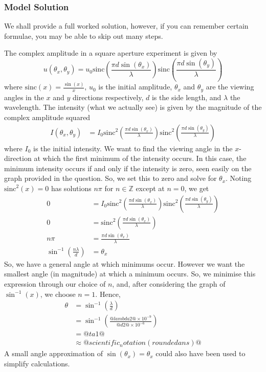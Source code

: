 \documentclass[a4paper,10pt]{article}
\begin{document}
\subsubsection{Model Solution}
We shall provide a full worked solution, however, if you can remember certain formulae, you may be able to skip out many steps.

The complex amplitude in a square aperture experiment is given by \[ u(\theta_x, \theta_y) = u_0 \text{sinc}\left(\frac{\pi d \sin(\theta_x)}{\lambda}\right) \text{sinc}\left(\frac{\pi d \sin(\theta_y)}{\lambda}\right) \] where \(\text{sinc}(x)=\frac{\sin(x)}{x}\), $u_0$ is the initial amplitude, \(\theta_x\) and \(\theta_y\) are the viewing angles in the \(x\) and \(y\) directions respectively, \(d\) is the side length, and \(\lambda\) the wavelength. The intensity (what we actually see) is given by the magnitude of the complex amplitude squared \begin{align*} I(\theta_x, \theta_y) &= I_0 \text{sinc}^2\left(\frac{\pi d \sin(\theta_x)}{\lambda}\right) \text{sinc}^2\left(\frac{\pi d \sin(\theta_y)}{\lambda}\right) \end{align*} where $I_0$ is the initial intensity. We want to find the viewing angle in the \(x\)-direction at which the first minimum of the intensity occurs. In this case, the minimum intensity occurs if and only if the intensity is zero, seen easily on the graph provided in the question. So, we set this to zero and solve for \(\theta_x\). Noting \(\text{sinc}^2(x) = 0\) has solutions \(n\pi\) for \(n \in \mathbb{Z}\) except at \(n=0\), we get \begin{align*} 0 &= I_0 \text{sinc}^2\left(\frac{\pi d \sin(\theta_x)}{\lambda}\right) \text{sinc}^2\left(\frac{\pi d \sin(\theta_y)}{\lambda}\right) \\ 0 &= \text{sinc}^2\left(\frac{\pi d \sin(\theta_x)}{\lambda}\right) \\ n\pi &= \frac{\pi d \sin(\theta_x)}{\lambda} \\ \sin^{-1}\left( \frac{n \lambda}{d} \right) &= \theta_x \end{align*} So, we have a general angle at which minimums occur. However we want the smallest angle (in magnitude) at which a minimum occurs. So, we minimise this expression through our choice of \(n\), and, after considering the graph of \(\sin^{-1}(x)\), we choose \(n=1\). Hence, \begin{align*} \theta &= \sin^{-1}\left( \frac{\lambda}{d} \right) \\ &= \sin^{-1}\left( \frac{@lambda2@ \times 10^{-9}}{@d2@\times 10^{-6}} \right) \\ &= @ta1@ \\  &\approx @scientific_notation(roundedans)@ \end{align*} A small angle approximation of \(\sin(\theta_x) = \theta_x\) could also have been used to simplify calculations.
\end{document}
